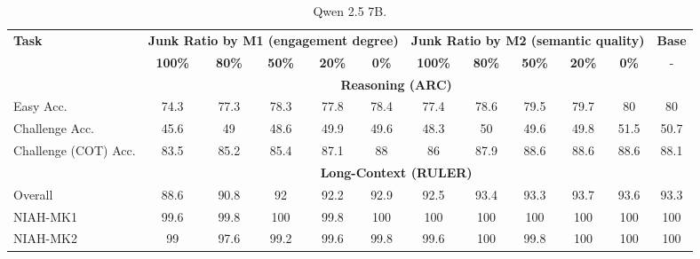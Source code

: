\begin{table}[ht]
\centering
\scriptsize
\caption{Qwen 2.5 7B.}
\label{tab:benchmark_qwen2.5_7b_full}
\setlength{\tabcolsep}{6pt}
\begin{tabular}{l|ccccc|ccccc|c}
\toprule
\multirow{2}{*}{\textbf{Task}}  & \multicolumn{5}{c|}{\textbf{Junk Ratio by M1 (engagement degree)}} & \multicolumn{5}{c|}{\textbf{Junk Ratio by M2 (semantic quality)}} & \textbf{Base} \\
 & \textbf{100\%} & \textbf{80\%} & \textbf{50\%} & \textbf{20\%} & \textbf{0\%} & \textbf{100\%} & \textbf{80\%} & \textbf{50\%} & \textbf{20\%} & \textbf{0\%} & - \\
\midrule
&\multicolumn{10}{c}{\textbf{Reasoning (ARC)}}\\
Easy Acc. & \cellcolor{myred!90} 74.3 & \cellcolor{myred!42} 77.3 & \cellcolor{myred!27} 78.3 & \cellcolor{myred!34} 77.8 & \cellcolor{myred!26} 78.4 & \cellcolor{myred!41} 77.4 & \cellcolor{myred!22} 78.6 & \cellcolor{myred!8} 79.5 & \cellcolor{myred!5} 79.7 & 80 & 80 \\
Challenge Acc. & \cellcolor{myred!90} 45.6 & \cellcolor{myred!30} 49 & \cellcolor{myred!36} 48.6 & \cellcolor{myred!14} 49.9 & \cellcolor{myred!18} 49.6 & \cellcolor{myred!42} 48.3 & \cellcolor{myred!12} 50 & \cellcolor{myred!20} 49.6 & \cellcolor{myred!15} 49.8 & \cellcolor{royalblue!15} 51.5 & 50.7 \\
Challenge (COT) Acc. & \cellcolor{myred!90} 83.5 & \cellcolor{myred!58} 85.2 & \cellcolor{myred!53} 85.4 & \cellcolor{myred!20} 87.1 & \cellcolor{myred!4} 88 & \cellcolor{myred!42} 86 & \cellcolor{myred!5} 87.9 & \cellcolor{royalblue!8} 88.6 & \cellcolor{royalblue!8} 88.6 & \cellcolor{royalblue!8} 88.6 & 88.1 \\
\midrule
&\multicolumn{10}{c}{\textbf{Long-Context (RULER)}}\\
Overall & \cellcolor{myred!90} 88.6 & \cellcolor{myred!49} 90.8 & \cellcolor{myred!26} 92 & \cellcolor{myred!21} 92.2 & \cellcolor{myred!8} 92.9 & \cellcolor{myred!15} 92.5 & 93.4 & \cellcolor{myred!1} 93.3 & \cellcolor{royalblue!7} 93.7 & \cellcolor{royalblue!4} 93.6 & 93.3 \\
NIAH-MK1 & \cellcolor{myred!90} 99.6 & \cellcolor{myred!45} 99.8 & 100 & \cellcolor{myred!45} 99.8 & 100 & 100 & 100 & 100 & 100 & 100 & 100 \\
NIAH-MK2 & \cellcolor{myred!37} 99 & \cellcolor{myred!90} 97.6 & \cellcolor{myred!30} 99.2 & \cellcolor{myred!15} 99.6 & \cellcolor{myred!8} 99.8 & \cellcolor{myred!15} 99.6 & 100 & \cellcolor{myred!8} 99.8 & 100 & 100 & 100 \\

\end{tabular}
\end{table}
